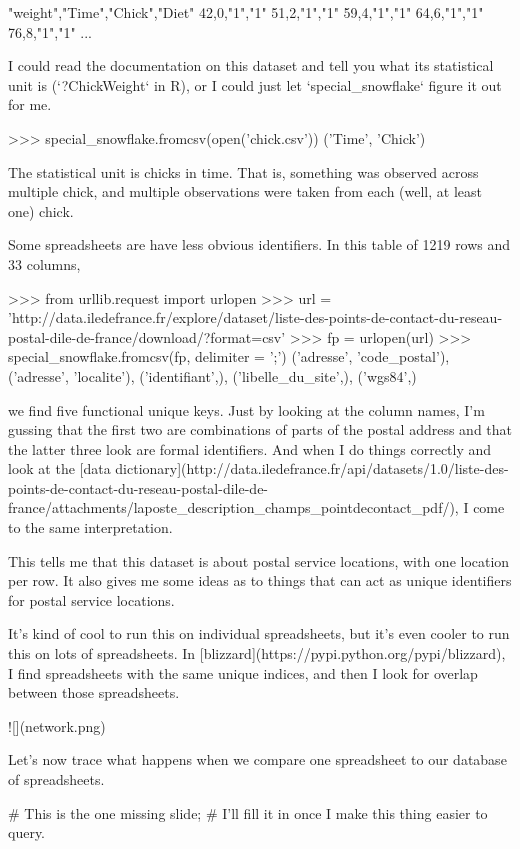 \documentclass{acm_proc_article-sp}
\begin{document}
    "weight","Time","Chick","Diet"
    42,0,"1","1"
    51,2,"1","1"
    59,4,"1","1"
    64,6,"1","1"
    76,8,"1","1"
    ...

I could read the documentation on this dataset and tell you
what its statistical unit is (`?ChickWeight` in R), or I could
just let `special_snowflake` figure it out for me.

    >>> special_snowflake.fromcsv(open('chick.csv'))
    {('Time', 'Chick')}

The statistical unit is chicks in time. That is, something was
observed across multiple chick, and multiple observations were
taken from each (well, at least one) chick.

Some spreadsheets are have less obvious identifiers. In this
table of 1219 rows and 33 columns,

    >>> from urllib.request import urlopen
    >>> url = 'http://data.iledefrance.fr/explore/dataset/liste-des-points-de-contact-du-reseau-postal-dile-de-france/download/?format=csv'
    >>> fp = urlopen(url)
    >>> special_snowflake.fromcsv(fp, delimiter = ';')
    {('adresse', 'code_postal'),
     ('adresse', 'localite'),
     ('identifiant',),
     ('libelle_du_site',),
     ('wgs84',)}

we find five functional unique keys. Just by looking at the column names,
I'm gussing that the first two are combinations of parts of the postal address
and that the latter three look are formal identifiers.
And when I do things correctly and look at the
[data dictionary](http://data.iledefrance.fr/api/datasets/1.0/liste-des-points-de-contact-du-reseau-postal-dile-de-france/attachments/laposte_description_champs_pointdecontact_pdf/),
I come to the same interpretation.

This tells me that this dataset is about postal service locations,
with one location per row. It also gives me some ideas as to things that can
act as unique identifiers for postal service locations.

It's kind of cool to run this on individual spreadsheets, but it's even cooler
to run this on lots of spreadsheets.
In [blizzard](https://pypi.python.org/pypi/blizzard), I find spreadsheets with
the same unique indices, and then I look for overlap between those spreadsheets.

![](network.png)

Let's now trace what happens when we compare one spreadsheet to our database
of spreadsheets.

    # This is the one missing slide;
    # I'll fill it in once I make this thing easier to query.
\end{document}
